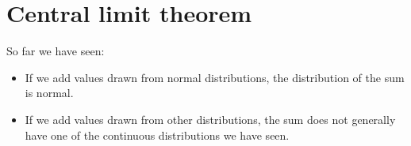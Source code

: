 \documentclass[12pt]{book}
\begin{document}

%
%
%
%

%
%






\section{Central limit theorem}
\label{CLT}

So far we have seen:

\begin{itemize}

\item If we add values drawn from normal distributions, the distribution
of the sum is normal.

\item If we add values drawn from other distributions, the sum does not
generally have one of the continuous distributions we have seen.

\end{itemize}
\end{document}
